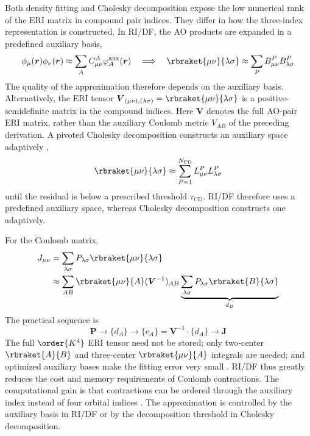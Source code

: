 \documentclass[11pt,a4paper,titlepage]{article}
\numberwithin{equation}{section}
\newcommand{\br}{\boldsymbol{r}}
\newcommand{\bJ}{\boldsymbol{J}}
\newcommand{\bP}{\boldsymbol{P}}
\newcommand{\bV}{\boldsymbol{V}}
\begin{document}
Both density fitting and Cholesky decomposition expose the low numerical rank
of the ERI matrix in compound pair indices. They differ in how the
three-index representation is constructed.
In RI/DF, the AO products are expanded in a predefined auxiliary basis,
\begin{equation}
 \phi_\mu(\br)\phi_\nu(\br)
 \approx\sum_AC_{\mu\nu}^A\varphi_A^\text{aux}(\br)
 \quad\Longrightarrow\quad
 \rbraket{\mu\nu}{\lambda\sigma}
 \approx\sum_PB_{\mu\nu}^PB_{\lambda\sigma}^P
\end{equation}
The quality of the approximation therefore depends on the auxiliary basis.
Alternatively, the ERI tensor
$\bV_{(\mu\nu),(\lambda\sigma)}=\rbraket{\mu\nu}{\lambda\sigma}$ is a
positive-semidefinite matrix in the compound indices. Here $\bV$ denotes the
full AO-pair ERI matrix, rather than the auxiliary Coulomb metric
$V_{AB}$ of the preceding derivation. A pivoted Cholesky
decomposition constructs an auxiliary space adaptively
\citep{BeebeLinderberg1977},
\begin{equation}
 \rbraket{\mu\nu}{\lambda\sigma}
 \approx\sum_{P=1}^{N_\text{CD}}L_{\mu\nu}^PL_{\lambda\sigma}^P
\end{equation}
until the residual is below a prescribed threshold $\tau_\text{CD}$. RI/DF
therefore uses a predefined auxiliary space, whereas Cholesky decomposition
constructs one adaptively.

For the Coulomb matrix,
\begin{equation}
\begin{split}
 J_{\mu\nu}
 &=\sum_{\lambda\sigma}P_{\lambda\sigma}
 \rbraket{\mu\nu}{\lambda\sigma}\\
 &\approx\sum_{AB}\rbraket{\mu\nu}{A}(\bV^{-1})_{AB}
 \underbrace{\sum_{\lambda\sigma}P_{\lambda\sigma}
 \rbraket{B}{\lambda\sigma}}_{d_B}
\end{split}
\end{equation}
The practical sequence is
\begin{equation}
 \bP\longrightarrow\{d_A\}\longrightarrow
 \{c_A\}=\bV^{-1}\cdot\{d_A\}\longrightarrow\bJ
\end{equation}
The full $\order{K^4}$ ERI tensor need not be stored; only two-center
$\rbraket{A}{B}$ and three-center $\rbraket{\mu\nu}{A}$ integrals are needed;
and optimized auxiliary bases make the fitting error very small
\citep{Weigend2006}. RI/DF thus greatly reduces the cost and memory
requirements of Coulomb contractions.
The computational gain is that contractions can be ordered through the
auxiliary index instead of four orbital indices \citep{Weigend2002}. The approximation is
controlled by the auxiliary basis in RI/DF or by the decomposition threshold
in Cholesky decomposition.
\end{document}
